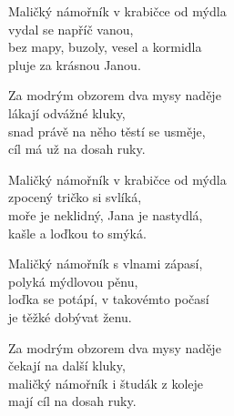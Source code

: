 
\ve{}
Maličký námořník v krabičce od mýdla\\
vydal se napříč vanou,\\
bez mapy, buzoly, vesel a kormidla\\
pluje za krásnou Janou.

\cho{}
Za modrým obzorem dva mysy naděje\\
lákají odvážné kluky,\\
snad právě na něho těstí se usměje,\\
cíl má už na dosah ruky.

\ve{}
Maličký námořník v krabičce od mýdla\\
zpocený tričko si svlíká,\\
moře je neklidný, Jana je nastydlá,\\
kašle a loďkou to smýká. 

\cho{}

\ve{}
Maličký námořník s vlnami zápasí,\\
polyká mýdlovou pěnu,\\
loďka se potápí, v takovémto počasí\\
je těžké dobývat ženu. 

\cho{}
Za modrým obzorem dva mysy naděje\\
čekají na další kluky,\\
maličký námořník i študák z koleje\\
mají cíl na dosah ruky.

\esong
